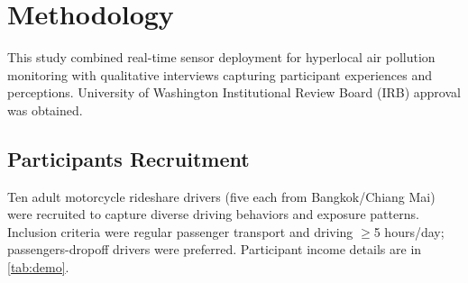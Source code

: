 \section{Methodology}

This study combined real-time sensor deployment for hyperlocal air pollution monitoring with qualitative interviews capturing participant experiences and perceptions.
University of Washington Institutional Review Board (IRB) approval was obtained.

\subsection{Participants Recruitment}

Ten adult motorcycle rideshare drivers (five each from Bangkok/Chiang Mai) were recruited to capture diverse driving behaviors and exposure patterns.
Inclusion criteria were regular passenger transport and driving $\ge$5 hours/day; passengers-dropoff drivers were preferred.
Participant income details are in \autoref{tab:demo}.

